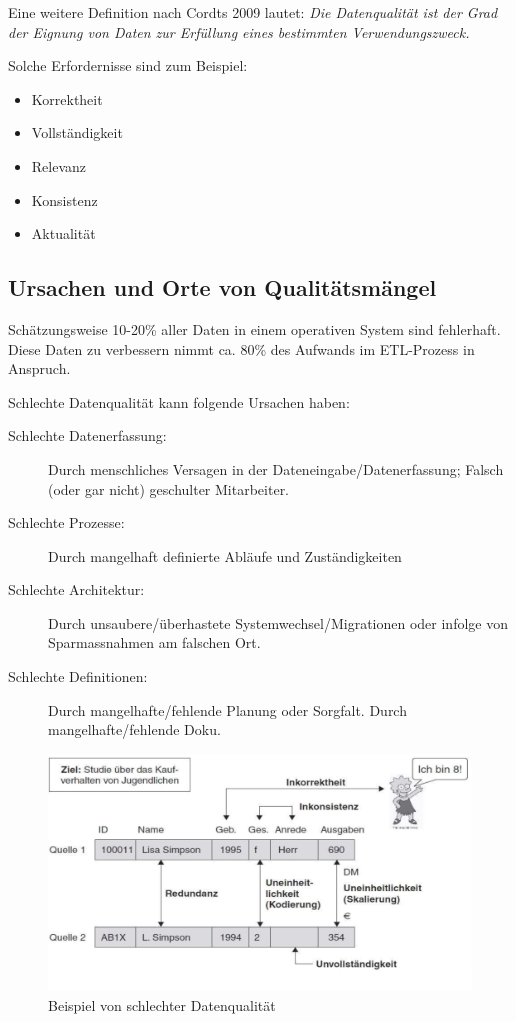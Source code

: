 \documentclass[a4paper, 11pt, nofootinbib]{article}
\begin{document}
\noindent Eine weitere Definition nach Cordts 2009 lautet: \textit{Die Datenqualität ist der Grad der Eignung von Daten zur Erfüllung eines bestimmten Verwendungszweck.}

Solche Erfordernisse sind zum Beispiel:
\begin{itemize}
	\item Korrektheit
	\item Vollständigkeit
	\item Relevanz
	\item Konsistenz
	\item Aktualität
\end{itemize}

\subsection{Ursachen und Orte von Qualitätsmängel}
Schätzungsweise 10-20\% aller Daten in einem operativen System sind fehlerhaft. Diese Daten zu verbessern nimmt ca. 80\% des Aufwands im ETL-Prozess in Anspruch.

Schlechte Datenqualität kann folgende Ursachen haben:

\begin{description}
	\item[Schlechte Datenerfassung: ] Durch menschliches Versagen in der Dateneingabe/Datenerfassung; Falsch (oder gar nicht) geschulter Mitarbeiter.
	\item[Schlechte Prozesse: ] Durch mangelhaft definierte Abläufe und Zuständigkeiten
	\item[Schlechte Architektur: ] Durch unsaubere/überhastete Systemwechsel/Migrationen oder infolge von Sparmassnahmen am falschen Ort.
	\item[Schlechte Definitionen: ] Durch mangelhafte/fehlende Planung oder Sorgfalt. Durch mangelhafte/fehlende Doku.
\end{description}

\begin{figure}[htb!]
	\centering
	\includegraphics[keepaspectratio=true,height=13\baselineskip]{data_quality.PNG}
	\caption{Beispiel von schlechter Datenqualität}
\end{figure}
\end{document}
